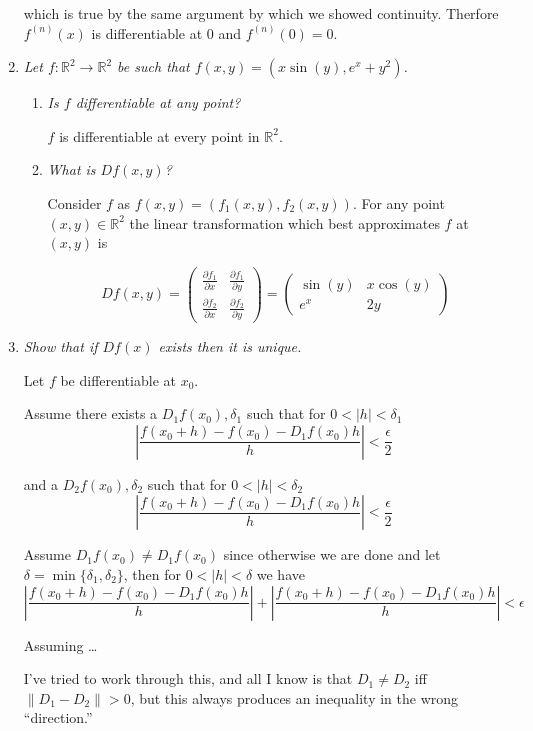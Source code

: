 \documentclass[11pt]{article}
\begin{document}
\begin{enumerate}
which is true by the same argument by which we showed continuity. Therfore $f^{(n)}(x)$ is differentiable at $0$ and $f^{(n)}(0) = 0$.

\item \emph{Let $f: \mathbb{R}^2 \rightarrow \mathbb{R}^2$ be such that $f(x,y)=(x\sin(y),e^x+y^2)$.}
\begin{enumerate}
\item \emph{Is $f$ differentiable at any point?}

$f$ is differentiable at every point in $\mathbb{R}^2$.
\item \emph{What is $Df(x,y)$?}

Consider $f$ as $f(x,y) = (f_1(x,y), f_2(x,y))$.  For any point $(x,y) \in \mathbb{R}^2$ the linear transformation which best approximates $f$ at $(x,y)$ is

\[
Df(x,y) =
\left(
\begin{array}{cc}
\frac{\partial f_1}{\partial x} & \frac{\partial f_1}{\partial y} \\
\frac{\partial f_2}{\partial x} & \frac{\partial f_2}{\partial y}
\end{array}
\right)
=
\left(
\begin{array}{cc}
\sin(y) & x\cos(y) \\
e^x & 2y
\end{array}
\right)
\]
\end{enumerate}


\item \emph{Show that if $Df(x)$ exists then it is unique.}

Let $f$ be differentiable at $x_0$.

Assume there exists a $D_1f(x_0), \delta_1$ such that for $0<|h|<\delta_1$
\[\left|\frac{f(x_0 + h) - f(x_0) - D_1f(x_0)h}{h}\right| < \frac{\epsilon}{2}\]

and a $D_2f(x_0), \delta_2$ such that for $0<|h|<\delta_2$
\[\left|\frac{f(x_0 + h) - f(x_0) - D_1f(x_0)h}{h}\right| < \frac{\epsilon}{2}\]

Assume $D_1f(x_0) \neq D_1f(x_0)$ since otherwise we are done and let $\delta = \min\{\delta_1, \delta_2\}$, then for $0<|h|<\delta$ we have 
\[\left|\frac{f(x_0 + h) - f(x_0) - D_1f(x_0)h}{h}\right| + \left|\frac{f(x_0 + h) - f(x_0) - D_1f(x_0)h}{h}\right| < \epsilon\]

Assuming \ldots

I've tried to work through this, and all I know is that $D_1 \neq D_2$ iff $\|D_1 - D_2\| >0$, but this always produces an inequality in the wrong ``direction.''


\end{enumerate}
\end{document}
